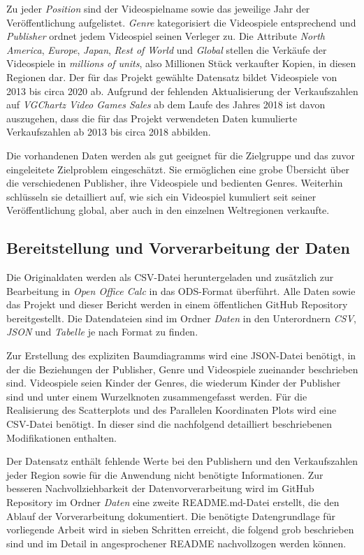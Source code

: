 \documentclass[usegeometry=true]{scrartcl}
\begin{document}
Zu jeder \textit{Position} sind der Videospielname sowie das jeweilige Jahr der Veröffentlichung aufgelistet. 
\textit{Genre} kategorisiert die Videospiele entsprechend und \textit{Publisher} ordnet jedem Videospiel seinen Verleger zu. 
Die Attribute \textit{North America}, \textit{Europe}, \textit{Japan}, \textit{Rest of World} und \textit{Global} stellen die Verkäufe der Videospiele in \textit{millions of units}, also Millionen Stück verkaufter Kopien, in diesen Regionen dar. 
Der für das Projekt gewählte Datensatz bildet Videospiele von 2013 bis circa 2020 ab. 
Aufgrund der fehlenden Aktualisierung der Verkaufszahlen auf \textit{VGChartz Video Games Sales} ab dem Laufe des Jahres 2018 ist davon auszugehen, dass die für das Projekt verwendeten Daten kumulierte Verkaufszahlen ab 2013 bis circa 2018 abbilden. 

Die vorhandenen Daten werden als gut geeignet für die Zielgruppe und das zuvor eingeleitete Zielproblem eingeschätzt.
Sie ermöglichen eine grobe Übersicht über die verschiedenen Publisher, ihre Videospiele und bedienten Genres. 
Weiterhin schlüsseln sie detailliert auf, wie sich ein Videospiel kumuliert seit seiner Veröffentlichung global, aber auch in den einzelnen Weltregionen verkaufte. 

\subsection{Bereitstellung und Vorverarbeitung der Daten}
Die Originaldaten werden als CSV-Datei heruntergeladen und zusätzlich zur Bearbeitung in \textit{Open Office Calc} in das ODS-Format überführt. 
Alle Daten sowie das Projekt und dieser Bericht werden in einem öffentlichen GitHub Repository bereitgestellt. 
Die Datendateien sind im Ordner \textit{Daten} in den Unterordnern \textit{CSV}, \textit{JSON} und \textit{Tabelle} je nach Format zu finden. 

Zur Erstellung des expliziten Baumdiagramms wird eine JSON-Datei benötigt, in der die Beziehungen der Publisher, Genre und Videospiele zueinander beschrieben sind. 
Videospiele seien Kinder der Genres, die wiederum Kinder der Publisher sind und unter einem Wurzelknoten zusammengefasst werden. 
Für die Realisierung des Scatterplots und des Parallelen Koordinaten Plots wird eine CSV-Datei benötigt. 
In dieser sind die nachfolgend detailliert beschriebenen Modifikationen enthalten. 

Der Datensatz enthält fehlende Werte bei den Publishern und den Verkaufszahlen jeder Region sowie für die Anwendung nicht benötigte Informationen. 
Zur besseren Nachvollziehbarkeit der Datenvorverarbeitung wird im GitHub Repository im Ordner \textit{Daten} eine zweite README.md-Datei erstellt, die den Ablauf der Vorverarbeitung dokumentiert. 
Die benötigte Datengrundlage für vorliegende Arbeit wird in sieben Schritten erreicht, die folgend grob beschrieben sind und im Detail in angesprochener README nachvollzogen werden können.
\end{document}
